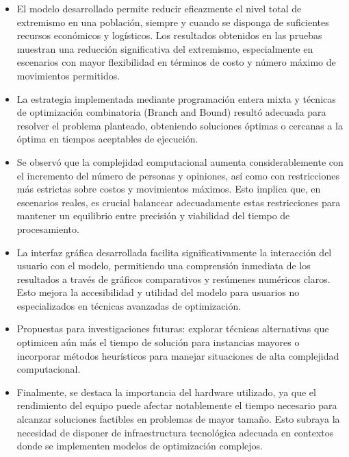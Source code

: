 \documentclass[11pt,letter]{article}
\begin{document}
\begin{itemize}
    \item El modelo desarrollado permite reducir eficazmente el nivel total de extremismo en una población, siempre y cuando se disponga de suficientes recursos económicos y logísticos. Los resultados obtenidos en las pruebas muestran una reducción significativa del extremismo, especialmente en escenarios con mayor flexibilidad en términos de costo y número máximo de movimientos permitidos.

    \item La estrategia implementada mediante programación entera mixta y técnicas de optimización combinatoria (Branch and Bound) resultó adecuada para resolver el problema planteado, obteniendo soluciones óptimas o cercanas a la óptima en tiempos aceptables de ejecución.

    \item Se observó que la complejidad computacional aumenta considerablemente con el incremento del número de personas y opiniones, así como con restricciones más estrictas sobre costos y movimientos máximos. Esto implica que, en escenarios reales, es crucial balancear adecuadamente estas restricciones para mantener un equilibrio entre precisión y viabilidad del tiempo de procesamiento.

    \item La interfaz gráfica desarrollada facilita significativamente la interacción del usuario con el modelo, permitiendo una comprensión inmediata de los resultados a través de gráficos comparativos y resúmenes numéricos claros. Esto mejora la accesibilidad y utilidad del modelo para usuarios no especializados en técnicas avanzadas de optimización.

    \item Propuestas para investigaciones futuras: explorar técnicas alternativas que optimicen aún más el tiempo de solución para instancias mayores o incorporar métodos heurísticos para manejar situaciones de alta complejidad computacional.

    \item Finalmente, se destaca la importancia del hardware utilizado, ya que el rendimiento del equipo puede afectar notablemente el tiempo necesario para alcanzar soluciones factibles en problemas de mayor tamaño. Esto subraya la necesidad de disponer de infraestructura tecnológica adecuada en contextos donde se implementen modelos de optimización complejos.



\end{itemize}
\end{document}
